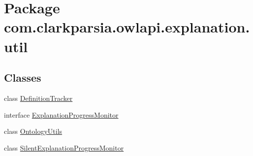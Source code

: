 \hypertarget{namespacecom_1_1clarkparsia_1_1owlapi_1_1explanation_1_1util}{\section{Package com.\-clarkparsia.\-owlapi.\-explanation.\-util}
\label{namespacecom_1_1clarkparsia_1_1owlapi_1_1explanation_1_1util}
}
\subsection*{Classes}
\begin{DoxyCompactItemize}
\item 
class \hyperlink{classcom_1_1clarkparsia_1_1owlapi_1_1explanation_1_1util_1_1_definition_tracker}{Definition\-Tracker}
\item 
interface \hyperlink{interfacecom_1_1clarkparsia_1_1owlapi_1_1explanation_1_1util_1_1_explanation_progress_monitor}{Explanation\-Progress\-Monitor}
\item 
class \hyperlink{classcom_1_1clarkparsia_1_1owlapi_1_1explanation_1_1util_1_1_ontology_utils}{Ontology\-Utils}
\item 
class \hyperlink{classcom_1_1clarkparsia_1_1owlapi_1_1explanation_1_1util_1_1_silent_explanation_progress_monitor}{Silent\-Explanation\-Progress\-Monitor}
\end{DoxyCompactItemize}
